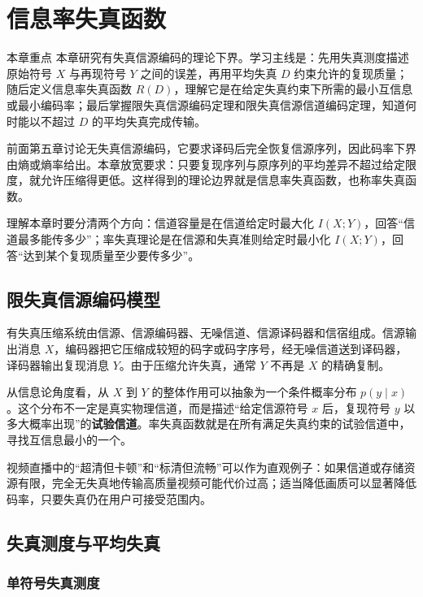 \section{信息率失真函数}

\begin{remarkBox}{本章重点}
本章研究有失真信源编码的理论下界。学习主线是：先用失真测度描述原始符号 $X$ 与再现符号 $Y$ 之间的误差，再用平均失真 $D$ 约束允许的复现质量；随后定义信息率失真函数 $R(D)$，理解它是在给定失真约束下所需的最小互信息或最小编码率；最后掌握限失真信源编码定理和限失真信源信道编码定理，知道何时能以不超过 $D$ 的平均失真完成传输。
\end{remarkBox}

前面第五章讨论无失真信源编码，它要求译码后完全恢复信源序列，因此码率下界由熵或熵率给出。本章放宽要求：只要复现序列与原序列的平均差异不超过给定限度，就允许压缩得更低。这样得到的理论边界就是信息率失真函数，也称率失真函数。

理解本章时要分清两个方向：信道容量是在信道给定时最大化 $I(X;Y)$，回答“信道最多能传多少”；率失真理论是在信源和失真准则给定时最小化 $I(X;Y)$，回答“达到某个复现质量至少要传多少”。

\subsection{限失真信源编码模型}

有失真压缩系统由信源、信源编码器、无噪信道、信源译码器和信宿组成。信源输出消息 $X$，编码器把它压缩成较短的码字或码字序号，经无噪信道送到译码器，译码器输出复现消息 $Y$。由于压缩允许失真，通常 $Y$ 不再是 $X$ 的精确复制。

从信息论角度看，从 $X$ 到 $Y$ 的整体作用可以抽象为一个条件概率分布 $p(y\mid x)$。这个分布不一定是真实物理信道，而是描述“给定信源符号 $x$ 后，复现符号 $y$ 以多大概率出现”的\textbf{试验信道}。率失真函数就是在所有满足失真约束的试验信道中，寻找互信息最小的一个。

视频直播中的“超清但卡顿”和“标清但流畅”可以作为直观例子：如果信道或存储资源有限，完全无失真地传输高质量视频可能代价过高；适当降低画质可以显著降低码率，只要失真仍在用户可接受范围内。

\subsection{失真测度与平均失真}

\subsubsection{单符号失真测度}


